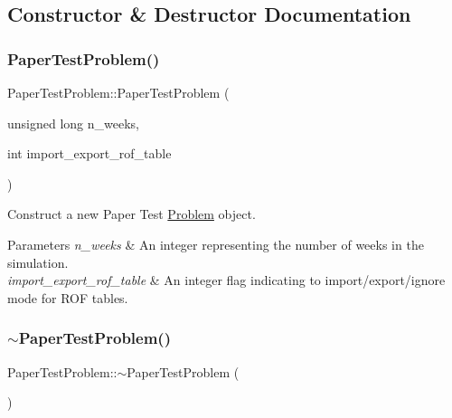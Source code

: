 \subsection{Constructor \& Destructor Documentation}
\mbox{\label{classPaperTestProblem_acc053a5b4515f3959494ce58c763d582}} 
\subsubsection{\texorpdfstring{Paper\+Test\+Problem()}{PaperTestProblem()}}
{\footnotesize\ttfamily Paper\+Test\+Problem\+::\+Paper\+Test\+Problem (\begin{DoxyParamCaption}\item[{unsigned long}]{n\+\_\+weeks,  }\item[{int}]{import\+\_\+export\+\_\+rof\+\_\+table }\end{DoxyParamCaption})}



Construct a new Paper Test \mbox{\hyperlink{classProblem}{Problem}} object. 


\begin{DoxyParams}{Parameters}
{\em n\+\_\+weeks} & An integer representing the number of weeks in the simulation. \\
\hline
{\em import\+\_\+export\+\_\+rof\+\_\+table} & An integer flag indicating to import/export/ignore mode for R\+OF tables. \\
\hline
\end{DoxyParams}
\mbox{\label{classPaperTestProblem_a571a92266d4c58ebc27e20391f7ad81b}} 
\subsubsection{\texorpdfstring{$\sim$\+Paper\+Test\+Problem()}{~PaperTestProblem()}}
{\footnotesize\ttfamily Paper\+Test\+Problem\+::$\sim$\+Paper\+Test\+Problem (\begin{DoxyParamCaption}{ }\end{DoxyParamCaption})\hspace{0.3cm}{\ttfamily [override]}}




